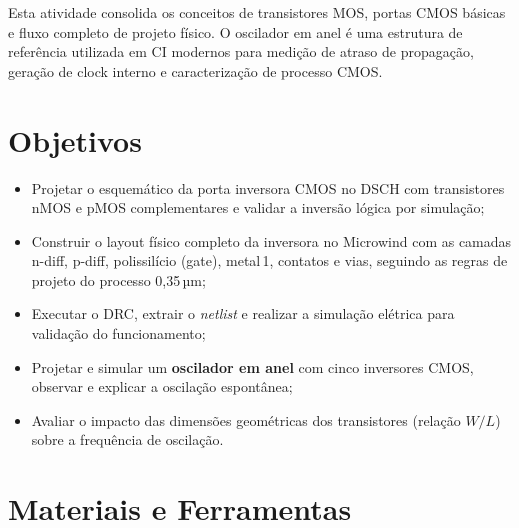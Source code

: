 \documentclass[12pt,a4paper]{article}
\begin{document}
\begin{unidadebox}
  Esta atividade consolida os conceitos de transistores MOS, portas CMOS básicas
  e fluxo completo de projeto físico. O oscilador em anel é uma estrutura de
  referência utilizada em CI modernos para medição de atraso de propagação,
  geração de clock interno e caracterização de processo CMOS.
\end{unidadebox}

\section{Objetivos}

\begin{itemize}[leftmargin=1.5cm]
  \item Projetar o esquemático da porta inversora CMOS no DSCH com transistores
        nMOS e pMOS complementares e validar a inversão lógica por simulação;
  \item Construir o layout físico completo da inversora no Microwind com as
        camadas n-diff, p-diff, polissilício (gate), metal\,1, contatos e vias,
        seguindo as regras de projeto do processo 0,35\,µm;
  \item Executar o DRC, extrair o \textit{netlist} e realizar a simulação
        elétrica para validação do funcionamento;
  \item Projetar e simular um \textbf{oscilador em anel} com cinco inversores
        CMOS, observar e explicar a oscilação espontânea;
  \item Avaliar o impacto das dimensões geométricas dos transistores (relação
        $W/L$) sobre a frequência de oscilação.
\end{itemize}

\section{Materiais e Ferramentas}
\end{document}
